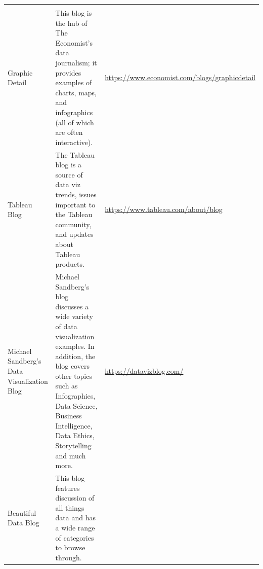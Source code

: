 \documentclass[]{book}
\begin{document}
\begin{longtable}[]{@{}lll@{}}
\begin{minipage}[t]{0.07\columnwidth}
\end{minipage}\tabularnewline
\begin{minipage}[t]{0.07\columnwidth}\raggedright
Graphic Detail\strut
\end{minipage} & \begin{minipage}[t]{0.77\columnwidth}\raggedright
This blog is the hub of The Economist's data journalism; it provides examples of charts, maps, and infographics (all of which are often interactive).\strut
\end{minipage} & \begin{minipage}[t]{0.07\columnwidth}\raggedright
\url{https://www.economist.com/blogs/graphicdetail}\strut
\end{minipage}\tabularnewline
\begin{minipage}[t]{0.07\columnwidth}\raggedright
Tableau Blog\strut
\end{minipage} & \begin{minipage}[t]{0.77\columnwidth}\raggedright
The Tableau blog is a source of data viz trends, issues important to the Tableau community, and updates about Tableau products.\strut
\end{minipage} & \begin{minipage}[t]{0.07\columnwidth}\raggedright
\url{https://www.tableau.com/about/blog}\strut
\end{minipage}\tabularnewline
\begin{minipage}[t]{0.07\columnwidth}\raggedright
Michael Sandberg's Data Visualization Blog\strut
\end{minipage} & \begin{minipage}[t]{0.77\columnwidth}\raggedright
Michael Sandberg's blog discusses a wide variety of data visualization examples. In addition, the blog covers other topics such as Infographics, Data Science, Business Intelligence, Data Ethics, Storytelling and much more.\strut
\end{minipage} & \begin{minipage}[t]{0.07\columnwidth}\raggedright
\url{https://datavizblog.com/}\strut
\end{minipage}\tabularnewline
\begin{minipage}[t]{0.07\columnwidth}\raggedright
Beautiful Data Blog\strut
\end{minipage} & \begin{minipage}[t]{0.77\columnwidth}\raggedright
This blog features discussion of all things data and has a wide range of categories to browse through.\strut
\end{minipage} & \begin{minipage}[t]{0.07\columnwidth}\raggedright

\end{minipage}
\end{longtable}
\end{document}
